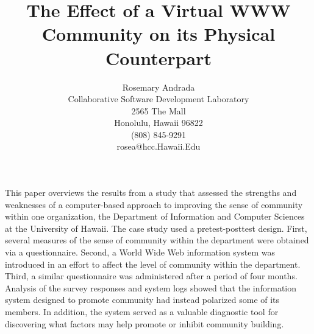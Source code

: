 



\title{The Effect of a Virtual WWW Community on its Physical Counterpart}

\author{
Rosemary Andrada\\
Collaborative Software Development Laboratory\\
2565 The Mall\\
Honolulu, Hawaii 96822\\
(808) 845-9291\\
rosea@hcc.Hawaii.Edu}

\maketitle

\abstract 

This paper overviews the results from a study that assessed the strengths and
weaknesses of a computer-based approach to improving the sense of community
within one organization, the Department of Information and Computer Sciences at
the University of Hawaii.  The case study used a pretest-posttest design.
First, several measures of the sense of community within the department were
obtained via a questionnaire.  Second, a World Wide Web information system was
introduced in an effort to affect the level of community within the department.
Third, a similar questionnaire was administered after a period of four months.
Analysis of the survey responses and system logs showed that the information
system designed to promote community had instead polarized some of its members.
In addition, the system served as a valuable diagnostic tool for discovering
what factors may help promote or inhibit community building.


